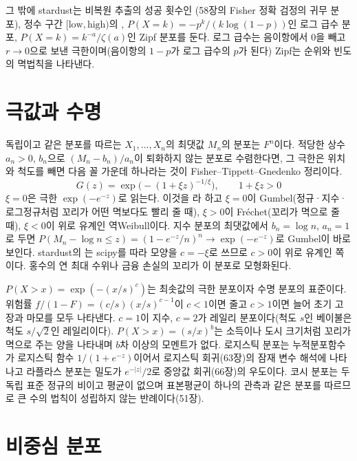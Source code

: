 그 밖에 stardust는 비복원 추출의 성공 횟수인 (58장의 Fisher 정확 검정의 귀무 분포), 정수 구간 $[\text{low},\text{high})$의 , $P(X=k)=-p^k/(k\log(1-p))$인 로그 급수 분포, $P(X=k)=k^{-a}/\zeta(a)$인 Zipf 분포를 둔다. 로그 급수는 음이항에서 $0$을 빼고 $r\to0$으로 보낸 극한이며(음이항의 $1-p$가 로그 급수의 $p$가 된다) Zipf는 순위와 빈도의 멱법칙을 나타낸다.

\section{극값과 수명}
\label{sec:extreme-value}

독립이고 같은 분포를 따르는 $X_1,\dots,X_n$의 최댓값 $M_n$의 분포는 $F^n$이다. 적당한 상수 $a_n>0$, $b_n$으로 $(M_n-b_n)/a_n$이 퇴화하지 않는 분포로 수렴한다면, 그 극한은 위치와 척도를 빼면 다음 꼴 가운데 하나라는 것이 Fisher--Tippett--Gnedenko 정리이다\cite{fisher1928extreme,gnedenko1943}.
\[
G(z)=\exp\bigl(-(1+\xi z)^{-1/\xi}\bigr),\qquad1+\xi z>0
\]
$\xi=0$은 극한 $\exp(-e^{-z})$로 읽는다. 이것을 라 하고 $\xi=0$이 Gumbel(정규·지수·로그정규처럼 꼬리가 어떤 멱보다도 빨리 줄 때), $\xi>0$이 Fréchet(꼬리가 멱으로 줄 때), $\xi<0$이 위로 유계인 역Weibull이다. 지수 분포의 최댓값에서 $b_n=\log n$, $a_n=1$로 두면 $P(M_n-\log n\le z)=(1-e^{-z}/n)^n\to\exp(-e^{-z})$로 Gumbel이 바로 보인다. stardust의 는 scipy를 따라 모양을 $c=-\xi$로 쓰므로 $c>0$이 위로 유계인 쪽이다. 홍수의 연 최대 수위나 금융 손실의 꼬리가 이 분포로 모형화된다.

 $P(X>x)=\exp(-(x/s)^c)$는 최솟값의 극한 분포이자 수명 분포의 표준이다. 위험률 $f/(1-F)=(c/s)(x/s)^{c-1}$이 $c<1$이면 줄고 $c>1$이면 늘어 초기 고장과 마모를 모두 나타낸다. $c=1$이 지수, $c=2$가 레일리 분포이다(척도 $s$인 베이불은 척도 $s/\sqrt2$인 레일리이다).  $P(X>x)=(s/x)^b$는 소득이나 도시 크기처럼 꼬리가 멱으로 주는 양을 나타내며 $b$차 이상의 모멘트가 없다. 로지스틱 분포는 누적분포함수가 로지스틱 함수 $1/(1+e^{-z})$이어서 로지스틱 회귀(63장)의 잠재 변수 해석에 나타나고 라플라스 분포는 밀도가 $e^{-|z|}/2$로 중앙값 회귀(66장)의 우도이다. 코시 분포는 두 독립 표준 정규의 비이고 평균이 없으며 표본평균이 하나의 관측과 같은 분포를 따르므로 큰 수의 법칙이 성립하지 않는 반례이다(51장).

\section{비중심 분포}
\label{sec:noncentral}

